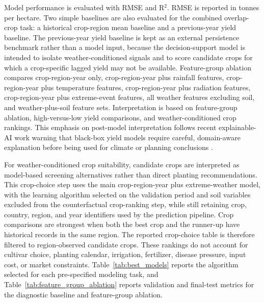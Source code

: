 \documentclass[11pt,a4paper]{article}
\begin{document}
Model performance is evaluated with RMSE and R$^2$. RMSE is reported in tonnes per hectare. Two simple baselines are also evaluated for the combined overlap-crop task: a historical crop-region mean baseline and a previous-year yield baseline. The previous-year yield baseline is kept as an external persistence benchmark rather than a model input, because the decision-support model is intended to isolate weather-conditioned signals and to score candidate crops for which a crop-specific lagged yield may not be available. Feature-group ablation compares crop-region-year only, crop-region-year plus rainfall features, crop-region-year plus temperature features, crop-region-year plus radiation features, crop-region-year plus extreme-event features, all weather features excluding soil, and weather-plus-soil feature sets. Interpretation is based on feature-group ablation, high-versus-low yield comparisons, and weather-conditioned crop rankings. This emphasis on post-model interpretation follows recent explainable-AI work warning that black-box yield models require careful, domain-aware explanation before being used for climate or planning conclusions \citep{Hu2023ExplainableYield,Mohan2025AIXAI}.

For weather-conditioned crop suitability, candidate crops are interpreted as model-based screening alternatives rather than direct planting recommendations. This crop-choice step uses the main crop-region-year plus extreme-weather model, with the learning algorithm selected on the validation period and soil variables excluded from the counterfactual crop-ranking step, while still retaining crop, country, region, and year identifiers used by the prediction pipeline. Crop comparisons are strongest when both the best crop and the runner-up have historical records in the same region. The reported crop-choice table is therefore filtered to region-observed candidate crops. These rankings do not account for cultivar choice, planting calendar, irrigation, fertilizer, disease pressure, input cost, or market constraints. Table~\ref{tab:best_models} reports the algorithm selected for each pre-specified modeling task, and Table~\ref{tab:feature_group_ablation} reports validation and final-test metrics for the diagnostic baseline and feature-group ablation.

\begin{table}[H]
\centering
\caption{Learning algorithm selected for each pre-specified modeling task. For each task, the learning algorithm is selected on 2011--2015 validation performance, refitted on 1989--2015, and reported on the 2016--2021 test period.}
\label{tab:best_models}
\scriptsize
\resizebox{\textwidth}{!}{}
\end{table}
\end{document}
